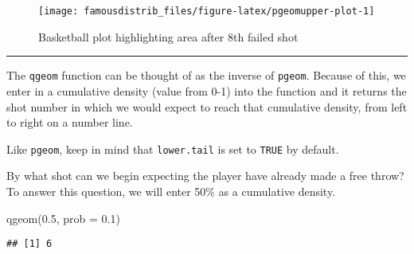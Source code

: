 \documentclass[
]{article}
\newenvironment{Shaded}{\begin{snugshade}}{\end{snugshade}}
\newcommand{\AttributeTok}[1]{\textcolor[rgb]{0.77,0.63,0.00}{#1}}
\newcommand{\DecValTok}[1]{\textcolor[rgb]{0.00,0.00,0.81}{#1}}
\newcommand{\FloatTok}[1]{\textcolor[rgb]{0.00,0.00,0.81}{#1}}
\newcommand{\FunctionTok}[1]{\textcolor[rgb]{0.00,0.00,0.00}{#1}}
\newcommand{\NormalTok}[1]{#1}
\newcommand{\OtherTok}[1]{\textcolor[rgb]{0.56,0.35,0.01}{#1}}
\newcommand{\SpecialCharTok}[1]{\textcolor[rgb]{0.00,0.00,0.00}{#1}}
\newcommand{\StringTok}[1]{\textcolor[rgb]{0.31,0.60,0.02}{#1}}
\begin{document}
\begin{figure}

{\centering \texttt{[image: famousdistrib\_files/figure-latex/pgeomupper-plot-1]} 

}

\caption{Basketball plot highlighting area after 8th failed shot}\label{fig:pgeomupper-plot}
\end{figure}

\begin{center}\rule{0.5\linewidth}{0.5pt}\end{center}

The \texttt{qgeom} function can be thought of as the inverse of \texttt{pgeom}. Because of this, we enter in a cumulative density (value from 0-1) into the function and it returns the shot number in which we would expect to reach that cumulative density, from left to right on a number line.

Like \texttt{pgeom}, keep in mind that \texttt{lower.tail} is set to \texttt{TRUE} by default.

By what shot can we begin expecting the player have already made a free throw? To answer this question, we will enter 50\% as a cumulative density.

\begin{Shaded}
\begin{Highlighting}[]
\FunctionTok{qgeom}\NormalTok{(}\FloatTok{0.5}\NormalTok{, }\AttributeTok{prob =} \FloatTok{0.1}\NormalTok{)}
\end{Highlighting}
\end{Shaded}

\begin{verbatim}
## [1] 6
\end{verbatim}

\begin{Shaded}
\end{Shaded}
\end{document}
